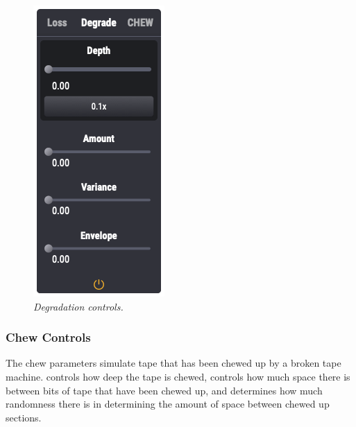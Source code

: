 \documentclass[landscape,twocolumn,a5paper]{manual}
\begin{document}
\begin{figure}[ht]
    \center
    \includegraphics[height=0.32\paperheight]{../Plugin/Screenshots/Degrade.png}
    \caption{\label{degrade_controls}{\it Degradation controls.}}
\end{figure}

\subsubsection{Chew Controls}
The chew parameters simulate tape that has been chewed up by
a broken tape machine.  controls how deep the
tape is chewed,  controls how much space
there is between bits of tape that have been chewed up, and
 determines how much randomness there is
in determining the amount of space between chewed up sections.
\end{document}
